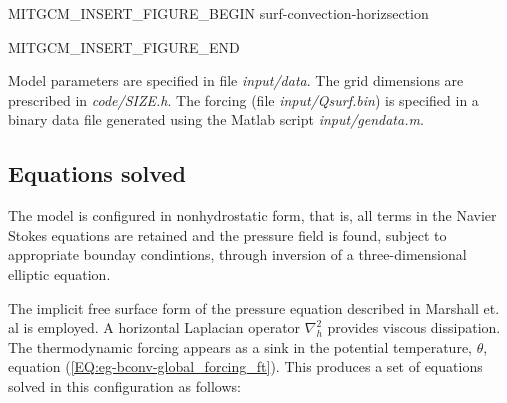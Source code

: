 \begin{rawhtml}MITGCM_INSERT_FIGURE_BEGIN surf-convection-horizsection\end{rawhtml}
\begin{figure}
\begin{center}
\end{center}
\caption{
}
\label{FIG:eg-bconv-horizsection}
\label{fig:surf-convection-horizsection}
\end{figure}
\begin{rawhtml}MITGCM_INSERT_FIGURE_END\end{rawhtml}

Model parameters are specified in file {\it input/data}. The grid dimensions are
prescribed in {\it code/SIZE.h}. The forcing (file {\it input/Qsurf.bin}) is specified 
in a binary data file generated using the Matlab script {\it input/gendata.m}.

\subsection{Equations solved}
\label{www:tutorials}

The model is configured in nonhydrostatic form, that is, all terms in the Navier 
Stokes equations are retained and the pressure field is found, subject to appropriate
bounday condintions, through inversion of a three-dimensional elliptic equation. 

The implicit free surface form of the
pressure equation described in Marshall et. al \cite{marshall:97a} is
employed. A horizontal Laplacian operator $\nabla_{h}^2$ provides viscous
dissipation. The thermodynamic forcing appears as a sink in the potential temperature, 
$\theta$, equation (\ref{EQ:eg-bconv-global_forcing_ft}). This produces a set of equations 
solved in this configuration as follows:

